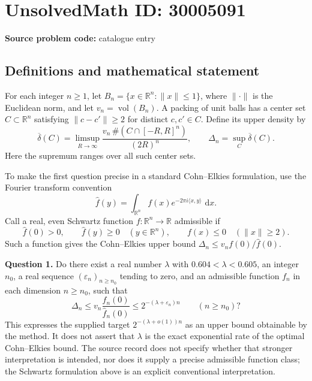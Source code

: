 \documentclass[11pt]{article}
\newcommand{\R}{\mathbb{R}}
\newcommand{\dd}{\,\mathrm{d}}
\begin{document}
\section*{UnsolvedMath ID: 30005091}
\textbf{Source problem code:} catalogue entry
\subsection{Definitions and mathematical statement}
For each integer \(n\geq 1\), let \(B_n=\{x\in\R^n:\|x\|\leq 1\}\), where \(\|\cdot\|\) is the Euclidean norm, and let \(v_n=\operatorname{vol}(B_n)\). A packing of unit balls has a center set \(C\subset\R^n\) satisfying \(\|c-c'\|\geq 2\) for distinct \(c,c'\in C\). Define its upper density by
\[
\overline\delta(C)=\limsup_{R\to\infty}\frac{v_n\,\#(C\cap[-R,R]^n)}{(2R)^n},
\qquad
\Delta_n=\sup_C\overline\delta(C).
\]
Here the supremum ranges over all such center sets.

To make the first question precise in a standard Cohn--Elkies formulation, use the Fourier transform convention
\[
\widehat f(y)=\int_{\R^n}f(x)e^{-2\pi i\langle x,y\rangle}\,\dd x.
\]
Call a real, even Schwartz function \(f:\R^n\to\R\) admissible if
\[
\widehat f(0)>0,\qquad \widehat f(y)\geq 0\quad(y\in\R^n),\qquad f(x)\leq 0\quad(\|x\|\geq 2).
\]
Such a function gives the Cohn--Elkies upper bound \(\Delta_n\leq v_n f(0)/\widehat f(0)\).

\textbf{Question 1.} Do there exist a real number \(\lambda\) with \(0.604<\lambda<0.605\), an integer \(n_0\), a real sequence \((\varepsilon_n)_{n\geq n_0}\) tending to zero, and an admissible function \(f_n\) in each dimension \(n\geq n_0\), such that
\[
\Delta_n\leq v_n\frac{f_n(0)}{\widehat f_n(0)}\leq 2^{-(\lambda+\varepsilon_n)n}\qquad(n\geq n_0)?
\]
This expresses the supplied target \(2^{-(\lambda+o(1))n}\) as an upper bound obtainable by the method. It does not assert that \(\lambda\) is the exact exponential rate of the optimal Cohn--Elkies bound. The source record does not specify whether that stronger interpretation is intended, nor does it supply a precise admissible function class; the Schwartz formulation above is an explicit conventional interpretation.
\end{document}
